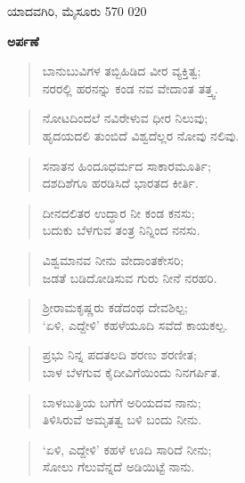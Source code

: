 \noindent ಯಾದವಗಿರಿ, ಮೈಸೂರು 570 020

\newpage\thispagestyle{empty}


\begin{center}
{\LARGE \textbf{ಅರ್ಪಣೆ}}
\end{center}

\begin{verse}
ಬಾನುಬುವಿಗಳ ತಬ್ಬಿಹಿಡಿದ ವೀರ ವ್ಯಕ್ತಿತ್ವ;\\ನರರಲ್ಲಿ ಹರನನ್ನು ಕಂಡ ನವ ವೇದಾಂತ ತತ್ತ್ವ.
\end{verse}

\begin{verse}
ನೋಟದಿಂದಲೆ ನವಿರೇಳುವ ಧೀರ ನಿಲುವು;\\ಹೃದಯದಲಿ ತುಂಬಿದೆ ವಿಶ್ವದೆಲ್ಲರ ನೋವು ನಲಿವು.
\end{verse}

\begin{verse}
ಸನಾತನ ಹಿಂದೂಧರ್ಮದ ಸಾಕಾರಮೂರ್ತಿ;\\ದಶದಿಶೆಗೂ ಹರಡಿಸಿದೆ ಭಾರತದ ಕೀರ್ತಿ.
\end{verse}

\begin{verse}
ದೀನದಲಿತರ ಉದ್ಧಾರ ನೀ ಕಂಡ ಕನಸು;\\ಬದುಕು ಬೆಳಗುವ ತಂತ್ರ ನಿನ್ನಿಂದ ನನಸು.
\end{verse}

\begin{verse}
ವಿಶ್ವಮಾನವ ನೀನು ವೇದಾಂತಕೇಸರಿ;\\ಜಡತೆ ಬಡಿದೋಡಿಸುವ ಗುರು ನೀನೆ ನರಹರಿ.
\end{verse}

\begin{verse}
ಶ‍್ರೀರಾಮಕೃಷ್ಣರು ಕಡೆದಂಥ ದೇವಶಿಲ್ಪ;\\‘ಏಳಿ, ಎದ್ದೇಳಿ’ ಕಹಳೆಯೂದಿ ಸವೆದೆ ಕಾಯಕಲ್ಪ.
\end{verse}

\begin{verse}
ಪ್ರಭು ನಿನ್ನ ಪದತಲದಿ ಶರಣು ಶರಣೀತ;\\ಬಾಳ ಬೆಳಗುವ ಕೈದೀವಿಗೆಯಿಂದು ನಿನಗರ್ಪಿತ.
\end{verse}

\begin{verse}
ಬಾಳಬುತ್ತಿಯ ಬಗೆಗೆ ಅರಿಯದವ ನಾನು;\\ತಿಳಿಸಿರುವೆ ಅಮೃತತ್ವ ಬಳಿ ಬಂದು ನೀನು.
\end{verse}

\begin{verse}
‘ಏಳಿ, ಎದ್ದೇಳಿ’ ಕಹಳೆ ಊದಿ ಸಾರಿದೆ ನೀನು;\\ಸೋಲು ಗೆಲುವೆನ್ನದೆ ಅಡಿಯಿಟ್ಟೆ ನಾನು.
\end{verse}

